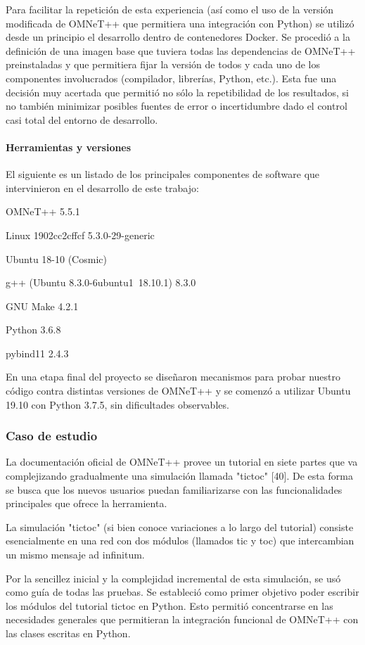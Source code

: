 \documentclass[]{article}
\begin{document}
Para facilitar la repetición de esta experiencia (así como el uso de la versión
modificada de OMNeT++ que permitiera una integración con Python) se utilizó
desde un principio el desarrollo dentro de contenedores Docker. Se procedió a
la definición de una imagen base que tuviera todas las dependencias de OMNeT++
preinstaladas y que permitiera fijar la versión de todos y cada uno de los
componentes involucrados (compilador, librerías, Python, etc.). Esta fue una
decisión muy acertada que permitió no sólo la repetibilidad de los resultados,
si no también minimizar posibles fuentes de error o incertidumbre dado el
control casi total del entorno de desarrollo.

\paragraph{Herramientas y versiones}

El siguiente es un listado de los principales componentes de software que
intervinieron en el desarrollo de este trabajo:

OMNeT++ 5.5.1

Linux 1902cc2cffcf 5.3.0-29-generic

Ubuntu 18-10 (Cosmic)

g++ (Ubuntu 8.3.0-6ubuntu1~18.10.1) 8.3.0

GNU Make 4.2.1

Python 3.6.8

pybind11 2.4.3

En una etapa final del proyecto se diseñaron mecanismos para probar nuestro
código contra distintas versiones de OMNeT++ y se comenzó a utilizar Ubuntu
19.10 con Python 3.7.5, sin dificultades observables.

\subsubsection{Caso de estudio}
La documentación oficial de OMNeT++ provee un tutorial en siete partes que va
complejizando gradualmente una simulación llamada "tictoc" [40]. De esta forma
se busca que los nuevos usuarios puedan familiarizarse con las funcionalidades
principales que ofrece la herramienta.

La simulación "tictoc" (si bien conoce variaciones a lo largo del tutorial)
consiste esencialmente en una red con dos módulos (llamados tic y toc) que
intercambian un mismo mensaje ad infinitum.


Por la sencillez inicial y la complejidad incremental de esta simulación, se
usó como guía de todas las pruebas. Se estableció como primer objetivo poder
escribir los módulos del tutorial tictoc en Python. Esto permitió concentrarse
en las necesidades generales que permitieran la integración funcional de
OMNeT++ con las clases escritas en Python.
\end{document}
